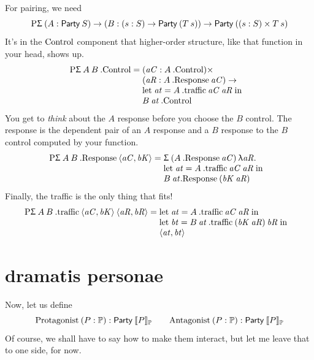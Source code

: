 \documentclass{book}
\newcommand{\F}[1]{\green{\ensuremath{\mathrm{#1}}}}
\newcommand{\N}[1]{\black{\ensuremath{#1}}}
\newcommand{\lett}[3]{\mathrm{let}\;#1 = #2\;\mathrm{in}\; #3}
\newcommand{\lam}[2]{\red{\uplambda} #1.\:#2}
\newcommand{\pr}[2]{\red{\langle\N{#1},\N{#2}\rangle}}
\begin{document}
For pairing, we need
\[
\F{P\Upsigma}\:(A : \Party{S})\to
(B : (s:S)\to\Party{(T\: s)})\to
\Party{((s:S)\times T\:s)}
\]
It's in the $\F{Control}$ component that higher-order structure,
like that function in your head, shows up.
\[
\F{P\Upsigma}\:A\:B\:.\F{Control} =
\begin{array}[t]{@{}l}
(\mathit{aC}:A\:.\F{Control})\times\\
  (\mathit{aR}:A\:.\F{Response}\:\mathit{aC})\to\\
  \lett{\mathit{at}}{A\:.\F{traffic}\:\mathit{aC}\:\mathit{aR}}
    {\\ B\:\mathit{at}\:.\F{Control}}
\end{array}
\]
You get to \emph{think}
about the $A$ response before you choose the $B$
control. The response is the dependent pair of an $A$ response
and a $B$ response to the $B$ control computed by your function.
\[
\F{P\Upsigma}\:A\:B\:.\F{Response}\:\pr{\mathit{aC}}{\mathit{bK}} =
\begin{array}[t]{@{}l}
  \Sg{(A\:.\F{Response}\:\mathit{aC})}
  {\lam{\mathit{aR}}{\\
  \lett{\mathit{at}}{A\:.\F{traffic}\:\mathit{aC}\:\mathit{aR}}
    {\\ B\:\mathit{at}.\F{Response}\:
    (\mathit{bK}\:\mathit{aR})}}}
\end{array}
\]
Finally, the traffic is the only thing that fits!
\[
\F{P\Upsigma}\:A\:B\:.\F{traffic}
\:\pr{\mathit{aC}}{\mathit{bK}}
\:\pr{\mathit{aR}}{\mathit{bR}} =\begin{array}[t]{@{}l}
\lett{\mathit{at}}{A\:.\F{traffic}\:\mathit{aC}\:\mathit{aR}}
{\\ \lett{\mathit{bt}}{B\:\mathit{at}\:.\F{traffic}\:
    (\mathit{bK}\:\mathit{aR})\:\mathit{bR}}
{\\ \pr{\mathit{at}}{\mathit{bt}}}}
\end{array}\]


\section{dramatis personae}

\renewcommand{\Play}[1]{\F{Protagonist}\:#1}
\renewcommand{\Oppo}[1]{\F{Antagonist}\:#1}
\newcommand{\Eith}[1]{\F{-tagonist}\:#1}
\newcommand{\Send}[1]{\F{P!}\:#1}
\newcommand{\Recv}[1]{\F{P?}\:#1}

Now, let us define
\[\Play{(P:\Protocol)}:\Party{\protocol{P}}\qquad \Oppo{(P:\Protocol)}:\Party{\protocol{P}}
\]
Of course, we shall have to say how to make them interact, but let me leave that to one side, for now.
\end{document}

